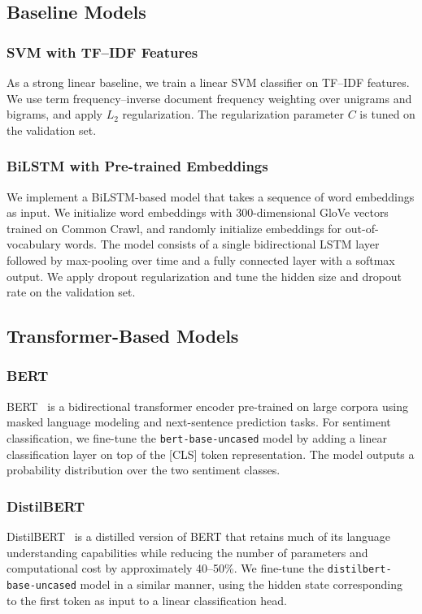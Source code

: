 \documentclass[conference]{IEEEtran}
\begin{document}
\subsection{Baseline Models}
\subsubsection{SVM with TF--IDF Features}
As a strong linear baseline, we train a linear SVM classifier on TF--IDF features. We use term frequency--inverse document frequency weighting over unigrams and bigrams, and apply $L_2$ regularization. The regularization parameter $C$ is tuned on the validation set.

\subsubsection{BiLSTM with Pre-trained Embeddings}
We implement a BiLSTM-based model that takes a sequence of word embeddings as input. We initialize word embeddings with 300-dimensional GloVe vectors trained on Common Crawl, and randomly initialize embeddings for out-of-vocabulary words. The model consists of a single bidirectional LSTM layer followed by max-pooling over time and a fully connected layer with a softmax output. We apply dropout regularization and tune the hidden size and dropout rate on the validation set.

\subsection{Transformer-Based Models}
\subsubsection{BERT}
BERT~\cite{devlin2019bert} is a bidirectional transformer encoder pre-trained on large corpora using masked language modeling and next-sentence prediction tasks. For sentiment classification, we fine-tune the \texttt{bert-base-uncased} model by adding a linear classification layer on top of the [CLS] token representation. The model outputs a probability distribution over the two sentiment classes.

\subsubsection{DistilBERT}
DistilBERT~\cite{sanh2019distilbert} is a distilled version of BERT that retains much of its language understanding capabilities while reducing the number of parameters and computational cost by approximately 40--50\%. We fine-tune the \texttt{distilbert-base-uncased} model in a similar manner, using the hidden state corresponding to the first token as input to a linear classification head.
\end{document}
